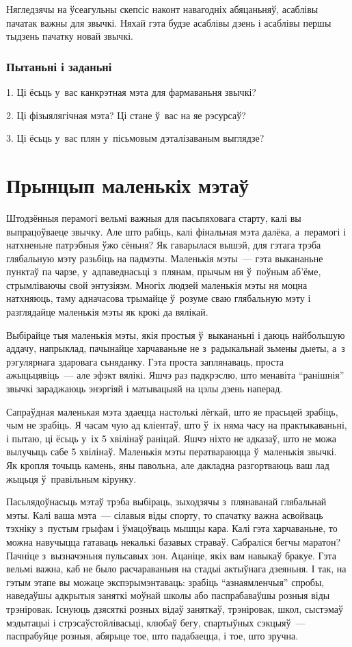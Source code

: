 Нягледзячы на ўсеагульны скепсіс наконт навагодніх абяцаньняў, асаблівы пачатак важны для звычкі. Няхай гэта будзе асаблівы дзень і асаблівы першы тыдзень пачатку новай звычкі.

\subsubsection{Пытаньні і заданьні}

1. Ці ёсьць у~вас канкрэтная мэта для фармаваньня звычкі?

2. Ці фізыялягічная мэта? Ці стане ў~вас на яе рэсурсаў?

3. Ці ёсьць у~вас плян у~пісьмовым дэталізаваным выглядзе?


\section{Прынцып маленькіх мэтаў}

Штодзённыя перамогі вельмі важныя для пасьпяховага старту, калі вы выпрацоўваеце звычку. Але што рабіць, калі фінальная мэта далёка, а~перамогі і натхненьне патрэбныя ўжо сёньня? Як гаварылася вышэй, для гэтага трэба глябальную мэту разьбіць на падмэты. Маленькія мэты~--- гэта выкананьне пунктаў па чарзе, у~адпаведнасьці з~плянам, прычым ня ў~поўным аб'ёме, стрымліваючы свой энтузіязм. Многіх людзей маленькія мэты ня моцна натхняюць, таму адначасова трымайце ў~розуме сваю глябальную мэту і разглядайце маленькія мэты як крокі да вялікай.

Выбірайце тыя маленькія мэты, якія простыя ў~выкананьні і даюць найбольшую аддачу, напрыклад, пачынайце харчаваньне не з~радыкальнай зьмены дыеты, а~з рэгулярнага здаровага сьняданку. Гэта проста заплянаваць, проста ажыцьцявіць~--- але эфэкт вялікі. Яшчэ раз падкрэслю, што менавіта ``ранішнія'' звычкі зараджаюць энэргіяй і матывацыяй на цэлы дзень наперад.

Сапраўдная маленькая мэта здаецца настолькі лёгкай, што яе прасьцей зрабіць, чым не зрабіць. Я часам чую ад кліентаў, што ў~іх няма часу на практыкаваньні, і пытаю, ці ёсьць у~іх 5 хвілінаў раніцай. Яшчэ ніхто не адказаў, што не можа вылучыць сабе 5 хвілінаў. Маленькія мэты ператвараюцца ў~маленькія звычкі. Як кропля точыць камень, яны павольна, але дакладна разгортваюць ваш лад жыцьця ў~правільным кірунку.

Пасьлядоўнасьць мэтаў трэба выбіраць, зыходзячы з~плянаванай глябальнай мэты. Калі ваша мэта~--- сілавыя віды спорту, то спачатку важна асвойваць тэхніку з~пустым грыфам і ўмацоўваць мышцы кара. Калі гэта харчаваньне, то можна навучыцца гатаваць некалькі базавых страваў. Сабраліся бегчы маратон? Пачніце з~вызначэньня пульсавых зон. Ацаніце, якіх вам навыкаў бракуе. Гэта вельмі важна, каб не было расчараваньня на стадыі актыўнага дзеяньня. І так, на гэтым этапе вы можаце экспэрымэнтаваць: зрабіць ``азнаямленчыя'' спробы, наведаўшы адкрытыя заняткі моўнай школы або паспрабаваўшы розныя віды трэніровак. Існуюць дзясяткі розных відаў заняткаў, трэніровак, школ, сыстэмаў мэдытацыі і стрэсаўстойлівасьці, клюбаў бегу, спартыўных сэкцыяў~--- паспрабуйце розныя, абярыце тое, што падабаецца, і тое, што зручна.

